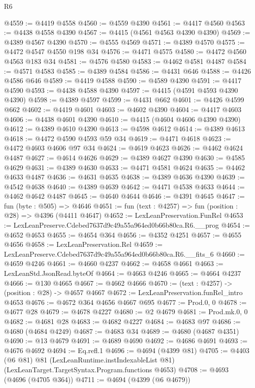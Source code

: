 \begin{lexlean}{R6}
\begin{coremodule}
@4559 := @4419 @4558
@4560 := @4559 @4390
@4561 := @4417 @4560
@4563 := @4438 @4558 @4390
@4567 := @4415 (@4561 @4563 @4390 @4390)
@4569 := @4389 @4567 @4390
@4570 := @4555 @4569
@4571 := @4389 @4570
@4575 := @4472 @4547 @4550 @198 @34
@4576 := @4471 @4575
@4580 := @4472 @4560 @4563 @183 @34
@4581 := @4576 @4580
@4583 := @4462 @4581 @4487
@4584 := @4571 @4583
@4585 := @4389 @4584
@4586 := @4431 @646
@4588 := @4426 @4586 @646
@4589 := @4419 @4588
@4590 := @4589 @4390
@4591 := @4417 @4590
@4593 := @4438 @4588 @4390
@4597 := @4415 (@4591 @4593 @4390 @4390)
@4598 := @4389 @4597
@4599 := @4431 @662
@4601 := @4426 @4599 @662
@4602 := @4419 @4601
@4603 := @4602 @4390
@4604 := @4417 @4603
@4606 := @4438 @4601 @4390
@4610 := @4415 (@4604 @4606 @4390 @4390)
@4612 := @4389 @4610 @4390
@4613 := @4598 @4612
@4614 := @4389 @4613
@4618 := @4472 @4590 @4593 @59 @34
@4619 := @4471 @4618
@4623 := @4472 @4603 @4606 @97 @34
@4624 := @4619 @4623
@4626 := @4462 @4624 @4487
@4627 := @4614 @4626
@4629 := @4389 @4627 @4390
@4630 := @4585 @4629
@4631 := @4389 @4630
@4633 := @4471 @4581 @4624
@4635 := @4462 @4633 @4487
@4636 := @4631 @4635
@4638 := @4389 @4636 @4390
@4639 := @4542 @4638
@4640 := @4389 @4639
@4642 := @4471 @4538 @4633
@4644 := @4462 @4642 @4487
@4645 := @4640 @4644
@4646 := @4391 @4645
@4647 := fun (byte : @505) => @4646
@4651 := fun (text : @4257) => fun (position : @28) => @4396 (@4411 @4647)
@4652 := LexLeanPreservation.FunRel
@4653 := LexLeanPreserve.Cdebed7637d9c49a55a964ed0b66b80ca.R6.__prog
@4654 := @4652 @4653
@4655 := @4654 @364
@4656 := @4352 @4251
@4657 := @4655 @4656
@4658 := LexLeanPreservation.Rel
@4659 := LexLeanPreserve.Cdebed7637d9c49a55a964ed0b66b80ca.R6.__fits_6
@4660 := @4659 @4246
@4661 := @4660 @4237
@4662 := @4658 @4661
@4663 := LexLeanStd.JsonRead.byteOf
@4664 := @4663 @4246
@4665 := @4664 @4237
@4666 := @130 @4665
@4667 := @4662 @4666
@4670 := (text : @4257) -> (position : @28) -> @4657 @4667
@4672 := LexLeanPreservation.funRel_intro @4653
@4676 := @4672 @364 @4656 @4667 @695
@4677 := Prod.{0, 0}
@4678 := @4677 @28
@4679 := @4678 @4227
@4680 := @2 @4679
@4681 := Prod.mk.{0, 0}
@4682 := @4681 @28
@4683 := @4682 @4227
@4684 := @4683 @97
@4686 := @4680 (@4684 @4249)
@4687 := @4683 @34
@4689 := @4680 (@4687 @4351)
@4690 := @13 @4679
@4691 := @4689 @4690
@4692 := @4686 @4691
@4693 := @4676 @4692
@4694 := Eq.refl.{1}
@4696 := @4694 (@4399 @81)
@4705 := @4403
    (@6 @81)
    @81
    (LexLeanRuntime.instIndexableList @81)
    (LexLeanTarget.TargetSyntax.Program.functions @4653)
@4708 := @4693 (@4696 (@4705 @364))
@4711 := @4694 (@4399 (@6 @4679))

\end{coremodule}
\end{lexlean}
